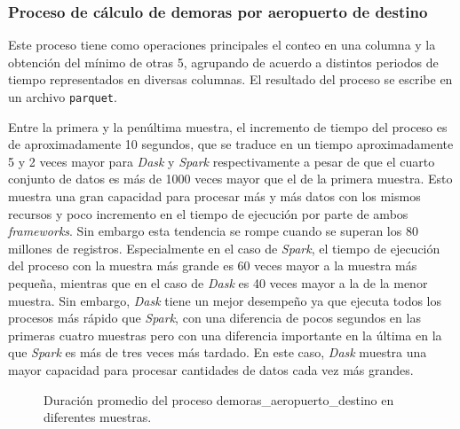 \subsubsection{Proceso de cálculo de demoras por aeropuerto de destino}

Este proceso tiene como operaciones principales el conteo en una columna y la obtención del mínimo de otras 5, agrupando de acuerdo a distintos periodos de tiempo representados en diversas columnas. El resultado del proceso se escribe en un archivo \texttt{parquet}.

Entre la primera y la penúltima muestra, el incremento de tiempo del proceso es de aproximadamente 10 segundos, que se traduce en un tiempo aproximadamente 5 y 2 veces mayor para \textit{Dask} y \textit{Spark} respectivamente a pesar de que el cuarto conjunto de datos es más de 1000 veces mayor que el de la primera muestra. Esto muestra una gran capacidad para procesar más y más datos con los mismos recursos y poco incremento en el tiempo de ejecución por parte de ambos \textit{frameworks}. Sin embargo esta tendencia se rompe cuando se superan los 80 millones de registros. Especialmente en el caso de \textit{Spark}, el tiempo de ejecución del proceso con la muestra más grande es 60 veces mayor a la muestra más pequeña, mientras que en el caso de \textit{Dask} es 40 veces mayor a la de la menor muestra. Sin embargo, \textit{Dask} tiene un mejor desempeño ya que ejecuta todos los procesos más rápido que \textit{Spark}, con una diferencia de pocos segundos en las primeras cuatro muestras pero con una diferencia importante en la última en la que \textit{Spark} es más de tres veces más tardado. En este caso, \textit{Dask} muestra una mayor capacidad para procesar cantidades de datos cada vez más grandes.

\begin{figure}
\centering
{}
\caption{Duración promedio del proceso demoras\_aeropuerto\_destino en diferentes muestras.}
\label{lineas:local-demoras-aeropuerto-destino}
\end{figure}

